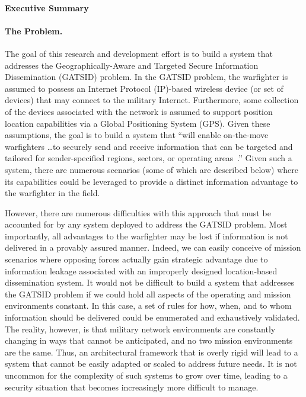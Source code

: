 \documentclass{sbir}
\begin{document}
\paragraph{Executive Summary}
\paragraph{The Problem.} The goal of this research and development effort is to build a system that addresses the Geographically-Aware and Targeted Secure Information Dissemination (GATSID) problem. In the GATSID problem, the warfighter is assumed to possess an Internet Protocol (IP)-based wireless device (or set of devices) that may connect to the military Internet. Furthermore, some collection of the devices associated with the network is assumed to support position location capabilities via a Global Positioning System (GPS). Given these assumptions, the goal is to build a system that ``will enable on-the-move warfighters \ldots to securely send and receive information that can be targeted and tailored for sender-specified regions, sectors, or operating areas~\cite{AF131-039}.'' Given such a system, there are numerous scenarios (some of which are described below) where its capabilities could be leveraged to provide a distinct information advantage to the warfighter in the field.

However, there are numerous difficulties with this approach that must be accounted for by any system deployed to address the GATSID problem. Most importantly, all advantages to the warfighter may be lost if information is not delivered in a provably assured manner. Indeed, we can easily conceive of mission scenarios where opposing forces actually gain strategic advantage due to information leakage associated with an improperly designed location-based dissemination system. It would not be difficult to build a system that addresses the GATSID problem if we could hold all aspects of the operating and mission environments constant. In this case, a set of rules for how, when, and to whom information should be delivered could be enumerated and exhaustively validated. The reality, however, is that military network environments are constantly changing in ways that cannot be anticipated, and no two mission environments are the same. Thus, an architectural framework that is overly rigid will lead to a system that cannot be easily adapted or scaled to address future needs. It is not uncommon for the complexity of such systems to grow over time, leading to a security situation that becomes increasingly more difficult to manage.
\end{document}
